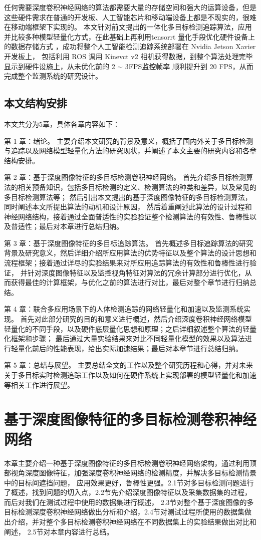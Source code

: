 任何需要深度卷积神经网络的算法都需要大量的存储空间和强大的运算设备，但是这些硬件需求在普通的开发板、人工智能芯片和移动端设备上都是不现实的，很难在移动端框架下实现的。
本文针对前文提出的一体化多目标检测追踪算法，应用并比较多种模型轻量化方式，在此基础上再利用tensorrt 量化手段优化硬件设备上的数据存储方式 ，成功将整个人工智能检测追踪系统部署在 Nvidia Jetson Xavier 开发板上，
包括利用 ROS 调用 Kinevct v2 相机获得数据，到整个算法处理完毕显示到硬件设施上，从未优化前的 2 $\sim$ 3FPS监控帧率 顺利提升到 20 FPS，从而完成整个监测系统的研究设计。

\section{本文结构安排}

本文共分为5章，具体各章内容如下：

第 1 章：绪论。
主要介绍本文研究的背景及意义，概括了国内外关于多目标检测与追踪以及网络模型轻量化方法的研究现状，并阐述了本文主要的研究内容和各章结构安排。

第 2 章：基于深度图像特征的多目标检测卷积神经网络。
首先介绍多目标检测算法的相关预备知识，包括多目标检测的定义、检测算法的种类和差异，以及常见的多目标检测算法等；
然后引出本文提出的基于深度图像特征的多目标检测算法，同时阐述本文所提出算法的动机和设计原因，
然后着重阐述此算法的设计过程和神经网络结构，接着通过全面普适性的实验验证整个检测算法的有效性、鲁棒性以及普适性；最后对本章进行总结归纳。

第 3 章：基于深度图像特征的多目标追踪算法。
首先概述多目标追踪算法的研究背景及研究意义，然后详细介绍所应用算法的优势特征以及整个算法的设计思想和流程框架；接着通过详尽的实验结果来对所应用追踪算法的有效性和鲁棒性进行验证，
并针对深度图像特征以及监控视角特征对算法的冗余计算部分进行优化，从而获得最佳的计算框架，与优化之前的算法进行对比，最后对整个章节进行归纳总结。

第 4 章：联合多应用场景下的人体检测追踪的网络轻量化和加速以及监测系统实现。
首先对此部分研究的目的和意义进行概述，然后介绍深度卷积神经网络模型轻量化的不同手段，以及硬件底层量化思想和原理；之后详细叙述整个算法的轻量化框架和步骤；
最后通过大量实验结果来对比不同轻量化模型的效果以及算法进行轻量化前后的性能表现，给出实际加速结果；最后对本章节进行总结归纳。

第 5 章：总结与展望。
主要总结全文的工作以及整个研究历程和心得，并对未来关于多目标实时检测追踪工作以及如何在硬件系统上实现部署的模型轻量化和加速等相关工作进行展望。

\chapter{基于深度图像特征的多目标检测卷积神经网络}
\label{chap2}
本章主要介绍一种基于深度图像特征的多目标检测卷积神经网络架构，通过利用顶部视角深度图像特征，加强深度卷积神经网络的检测精度，并解决多目标检测情景中的目标间遮挡问题，
应用效果更好，鲁棒性更强。2.1节对多目标检测问题进行了概述，找到问题的切入点，2.2节先介绍深度图像特征以及采集数据集的过程，而后对我们在测试过程中使用的数据集进行概述，
2.3节对整个基于深度图像的多目标检测深度卷积神经网络做出分析和介绍，2.4节对测试过程所使用的数据集做出介绍，并对整个多目标检测卷积神经网络在不同数据集上的实验结果做出对比和阐述，
2.5节对本章内容进行总结。

